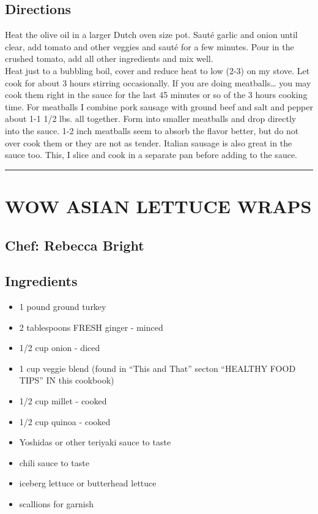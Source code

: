 \documentclass[
]{book}
\providecommand{\tightlist}{%
  \setlength{\itemsep}{0pt}\setlength{\parskip}{0pt}}
\begin{document}
\hypertarget{directions-70}{%
\subsection*{Directions}\label{directions-70}}


Heat the olive oil in a larger Dutch oven size pot. Sauté garlic and onion until clear, add tomato and other
veggies and sauté for a few minutes. Pour in the crushed tomato, add all other ingredients and mix well.\\
Heat just to a bubbling boil, cover and reduce heat to low (2-3) on my stove.
Let cook for about 3 hours stirring occasionally. If you are doing meatballs\ldots{} you may cook them right
in the sauce for the last 45 minutes or so of the 3 hours cooking time. For meatballs I combine pork
sausage with ground beef and salt and pepper about 1-1 1/2 lbs. all together. Form into smaller meatballs
and drop directly into the sauce. 1-2 inch meatballs seem to absorb the flavor better, but do not over cook
them or they are not as tender. Italian sausage is also great in the sauce too. This, I slice and cook
in a separate pan before adding to the sauce.

\begin{center}\rule{0.5\linewidth}{0.5pt}\end{center}

\hypertarget{wow-asian-lettuce-wraps}{%
\section*{WOW ASIAN LETTUCE WRAPS}\label{wow-asian-lettuce-wraps}}


\hypertarget{chef-rebecca-bright-5}{%
\subsection*{Chef: Rebecca Bright}\label{chef-rebecca-bright-5}}


\hypertarget{ingredients-71}{%
\subsection*{Ingredients}\label{ingredients-71}}


\begin{itemize}
\tightlist
\item
  1 pound ground turkey
\item
  2 tablespoons FRESH ginger - minced
\item
  1/2 cup onion - diced
\item
  1 cup veggie blend (found in ``This and That'' secton ``HEALTHY FOOD TIPS'' IN this cookbook)
\item
  1/2 cup millet - cooked
\item
  1/2 cup quinoa - cooked
\item
  Yoshidas or other teriyaki sauce to taste
\item
  chili sauce to taste
\item
  iceberg lettuce or butterhead lettuce
\item
  scallions for garnish
\end{itemize}
\end{document}
